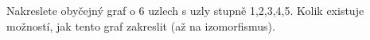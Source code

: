 \subsubsection{}
Nakreslete obyčejný graf o 6 uzlech s uzly stupně 1,2,3,4,5. Kolik existuje
možností, jak tento graf zakreslit (až na izomorfismus).
